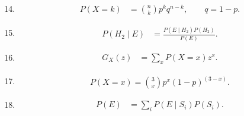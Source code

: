 \begin{enumerate}[label=\thesubsection.\arabic*, ref=\thesubsection.\theenumi, leftmargin=12mm, itemsep=4pt]
    \setcounter{enumi}{13}
    \item[\ref{question-short:C12-Q53}]
    \begin{align}
        P(X=k) &= \binom{n}{k}p^kq^{n-k},
        \qquad q=1-p.
        \label{formula:C12-Q53}
    \end{align}

    \setcounter{enumi}{14}
    \item[\ref{question-short:C12-Q54}]
    \begin{align}
        P(H_2\mid E) &= \frac{P(E\mid H_2)P(H_2)}{P(E)}.
        \label{formula:C12-Q54}
    \end{align}

    \setcounter{enumi}{15}
    \item[\ref{question-short:C12-Q55}]
    \begin{align}
        G_X(z) &= \sum_xP(X=x)z^x.
        \label{formula:C12-Q55}
    \end{align}

    \setcounter{enumi}{16}
    \item[\ref{question-short:C12-Q56}]
    \begin{align}
	    P(X=x)=\binom3xp^x(1-p)^{(3-x)}.
        \label{formula:C12-Q56}
    \end{align}

    \setcounter{enumi}{17}
    \item[\ref{question-short:C12-Q57}]
    \begin{align}
        P(E) &= \sum_iP(E\mid S_i)P(S_i).
        \label{formula:C12-Q57}
    \end{align}

\end{enumerate}
